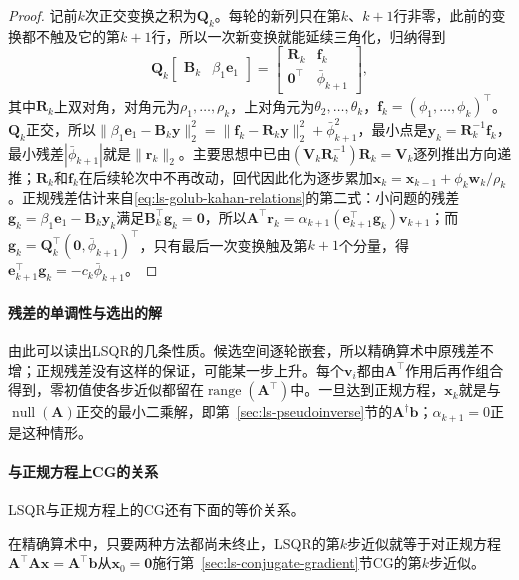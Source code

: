 \begin{proof}
记前$k$次正交变换之积为$\bm Q_k$。每轮的新列只在第$k$、$k+1$行非零，此前的变换都不触及它的第$k+1$行，所以一次新变换就能延续三角化，归纳得到
\[
 \bm Q_k\begin{bmatrix}\bm B_k&\beta_1\bm e_1\end{bmatrix}
 =\begin{bmatrix}\bm R_k&\bm f_k\\ \bm0^\top&\bar\phi_{k+1}\end{bmatrix},
\]
其中$\bm R_k$上双对角，对角元为$\rho_1,\ldots,\rho_k$，上对角元为$\theta_2,\ldots,\theta_k$，$\bm f_k=(\phi_1,\ldots,\phi_k)^\top$。$\bm Q_k$正交，所以$\lVert\beta_1\bm e_1-\bm B_k\bm y\rVert_2^2=\lVert\bm f_k-\bm R_k\bm y\rVert_2^2+\bar\phi_{k+1}^2$，最小点是$\bm y_k=\bm R_k^{-1}\bm f_k$，最小残差$|\bar\phi_{k+1}|$就是$\lVert\bm r_k\rVert_2$。主要思想中已由$(\bm V_k\bm R_k^{-1})\bm R_k=\bm V_k$逐列推出方向递推；$\bm R_k$和$\bm f_k$在后续轮次中不再改动，回代因此化为逐步累加$\bm x_k=\bm x_{k-1}+\phi_k\bm w_k/\rho_k$。正规残差估计来自\eqref{eq:ls-golub-kahan-relations}的第二式：小问题的残差$\bm g_k=\beta_1\bm e_1-\bm B_k\bm y_k$满足$\bm B_k^\top\bm g_k=\bm0$，所以$\bm A^\top\bm r_k=\alpha_{k+1}(\bm e_{k+1}^\top\bm g_k)\bm v_{k+1}$；而$\bm g_k=\bm Q_k^\top(\bm0,\bar\phi_{k+1})^\top$，只有最后一次变换触及第$k+1$个分量，得$\bm e_{k+1}^\top\bm g_k=-c_k\bar\phi_{k+1}$。
\end{proof}

\paragraph{残差的单调性与选出的解}
由此可以读出LSQR的几条性质。候选空间逐轮嵌套，所以精确算术中原残差不增；正规残差没有这样的保证，可能某一步上升。每个$\bm v_i$都由$\bm A^\top$作用后再作组合得到，零初值使各步近似都留在$\operatorname{range}(\bm A^\top)$中。一旦达到正规方程，$\bm x_k$就是与$\operatorname{null}(\bm A)$正交的最小二乘解，即第~\ref{sec:ls-pseudoinverse}节的$\bm A^\dagger\bm b$；$\alpha_{k+1}=0$正是这种情形。

\paragraph{与正规方程上CG的关系}
LSQR与正规方程上的CG还有下面的等价关系。

\begin{theorem}[LSQR与正规方程上的CG]
\label{thm:ls-lsqr-cg-equivalence}
在精确算术中，只要两种方法都尚未终止，LSQR的第$k$步近似就等于对正规方程$\bm A^\top\bm A\bm x=\bm A^\top\bm b$从$\bm x_0=\bm0$施行第~\ref{sec:ls-conjugate-gradient}节CG的第$k$步近似。
\end{theorem}

